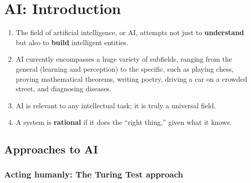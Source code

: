 \chapter{AI: Introduction}\label{Artificial Intelligence: Introduction}

\begin{enumerate}
    \item The field of artificial intelligence, or AI, attempts not just to \textbf{understand} but also to \textbf{build} intelligent entities.
    \hfill \cite{ai/book/Artificial-Intelligence-A-Modern-Approach/Russell-Norvig}

    \item AI currently encompasses a huge variety of subfields, ranging from the general (learning and perception) to the specific, such as playing chess, proving mathematical theorems, writing poetry, driving a car on a crowded street, and diagnosing diseases.    
    \hfill \cite{ai/book/Artificial-Intelligence-A-Modern-Approach/Russell-Norvig}

    \item AI is relevant to any intellectual task; it is truly a universal field.
    \hfill \cite{ai/book/Artificial-Intelligence-A-Modern-Approach/Russell-Norvig}

    \item A system is \textbf{rational} if it does the “right thing,” given what it knows.
    \hfill \cite{ai/book/Artificial-Intelligence-A-Modern-Approach/Russell-Norvig}
\end{enumerate}






\section{Approaches to AI}\label{Artificial Intelligence: Introduction/Approaches to AI}

\subsection{Acting humanly: The Turing Test approach}\label{Artificial Intelligence: Introduction/Approaches to AI/Acting humanly: The Turing Test approach}


